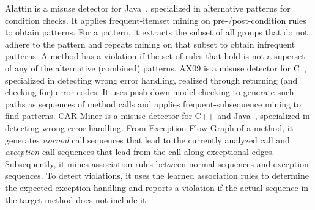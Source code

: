 Alattin is a misuse detector for Java~\cite{TX09b}, specialized in
alternative patterns for condition checks.
It applies frequent-itemset mining on pre-/post-condition
rules to obtain patterns.
For a pattern, it extracts the subset of all groups that do
not adhere to the pattern and repeats mining on that subset to obtain
infrequent patterns.
A method has a violation if the set of rules that hold 
is not a superset of any of the alternative (combined) patterns.
%
AX09 is a misuse detector for C~\cite{AX09}, specialized in detecting
wrong error handling, realized through returning (and checking for)
error codes.
It uses push-down model checking to generate such paths as sequences
of method calls and applies frequent-subsequence mining to find
patterns.
%
CAR-Miner is a misuse detector for C++ and Java~\cite{TX09},
specialized in detecting wrong error handling.
From Exception Flow Graph of a method, it
generates \emph{normal} call sequences that lead to the currently
analyzed call and \emph{exception} call sequences that lead from the
call along exceptional edges.  Subsequently, it mines association
rules between normal sequences and exception sequences.
To detect violations,
it uses the learned association rules to determine the expected
exception handling and reports a violation if the actual sequence in
the target method does not include it.

